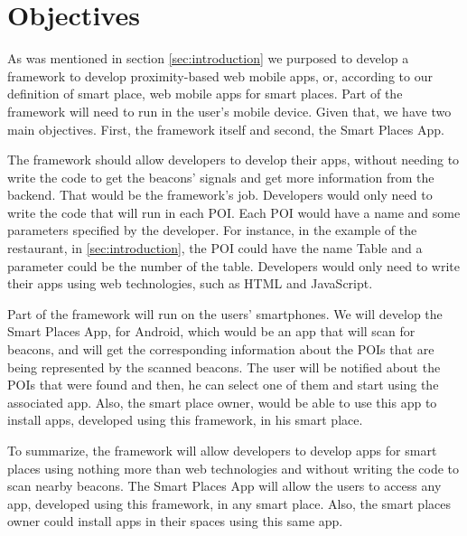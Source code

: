 
% 
% 

\section{Objectives}
\label{sec:objectives}

As was mentioned in section \ref{sec:introduction} we purposed
to develop a framework to develop proximity-based web mobile
apps, or, according to our definition of smart place, web
mobile apps for smart places.
Part of the framework will need to run in the user's 
mobile device.
Given that, we have two main objectives. First, the framework
itself and second, the Smart Places App.

The framework should allow developers to develop their apps,
without needing to write the code to get the beacons' signals
and get more information from the backend. That would be the
framework's job. Developers would only need to write the code
that will run in each POI. Each POI would have a name and
some parameters specified by the developer. 
For instance, in the example of the restaurant,
in \ref{sec:introduction}, the POI could have the name Table and
a parameter could be the number of the table.
Developers would only need to write their apps using web
technologies, such as HTML and JavaScript.

Part of the framework will run on the users' smartphones.
We will develop the Smart Places App, for Android, which would
be an  app that will scan for beacons, and will get the 
corresponding information about the POIs that are being 
represented by the scanned beacons.
The user will be notified about the POIs
that were found and then, he can select one of them and
start using the associated app. 
Also, the smart place owner, would be able to use this app
to install apps, developed using this framework, in his
smart place.

To summarize, the framework will allow developers to develop
apps for smart places using nothing more than web technologies
and without writing the code to scan nearby beacons.
The Smart Places App will allow the users to access any app,
developed using this framework, in any smart place. Also,
the smart places owner could install apps in their spaces
using this same app.
